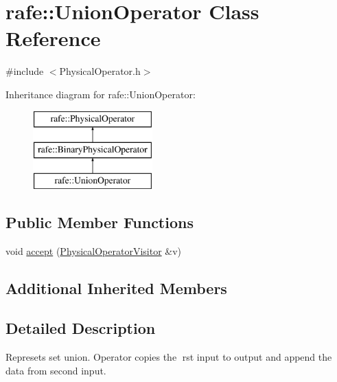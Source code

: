 \hypertarget{classrafe_1_1_union_operator}{\section{rafe\+:\+:Union\+Operator Class Reference}
\label{classrafe_1_1_union_operator}
}


{\ttfamily \#include $<$Physical\+Operator.\+h$>$}

Inheritance diagram for rafe\+:\+:Union\+Operator\+:\begin{figure}[H]
\begin{center}
\leavevmode
\includegraphics[height=3.000000cm]{classrafe_1_1_union_operator}
\end{center}
\end{figure}
\subsection*{Public Member Functions}
\begin{DoxyCompactItemize}
\item 
void \hyperlink{classrafe_1_1_union_operator_a5ae4b5f486376c816b10a81adbe784c7}{accept} (\hyperlink{classrafe_1_1_physical_operator_visitor}{Physical\+Operator\+Visitor} \&v)
\end{DoxyCompactItemize}
\subsection*{Additional Inherited Members}


\subsection{Detailed Description}
Represets set union. Operator copies the rst input to output and append the data from second input. 

